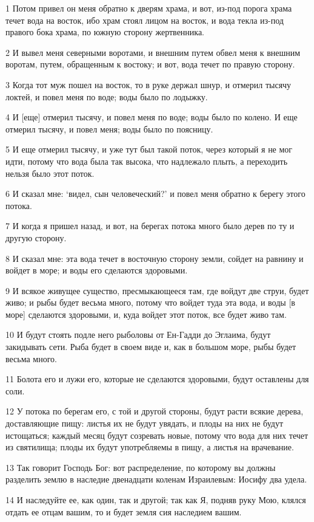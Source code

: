 \par 1 Потом привел он меня обратно к дверям храма, и вот, из-под порога храма течет вода на восток, ибо храм стоял лицом на восток, и вода текла из-под правого бока храма, по южную сторону жертвенника.
\par 2 И вывел меня северными воротами, и внешним путем обвел меня к внешним воротам, путем, обращенным к востоку; и вот, вода течет по правую сторону.
\par 3 Когда тот муж пошел на восток, то в руке держал шнур, и отмерил тысячу локтей, и повел меня по воде; воды было по лодыжку.
\par 4 И [еще] отмерил тысячу, и повел меня по воде; воды было по колено. И еще отмерил тысячу, и повел меня; воды было по поясницу.
\par 5 И еще отмерил тысячу, и уже тут был такой поток, через который я не мог идти, потому что вода была так высока, что надлежало плыть, а переходить нельзя было этот поток.
\par 6 И сказал мне: `видел, сын человеческий?' и повел меня обратно к берегу этого потока.
\par 7 И когда я пришел назад, и вот, на берегах потока много было дерев по ту и другую сторону.
\par 8 И сказал мне: эта вода течет в восточную сторону земли, сойдет на равнину и войдет в море; и воды его сделаются здоровыми.
\par 9 И всякое живущее существо, пресмыкающееся там, где войдут две струи, будет живо; и рыбы будет весьма много, потому что войдет туда эта вода, и воды [в море] сделаются здоровыми, и, куда войдет этот поток, все будет живо там.
\par 10 И будут стоять подле него рыболовы от Ен-Гадди до Эглаима, будут закидывать сети. Рыба будет в своем виде и, как в большом море, рыбы будет весьма много.
\par 11 Болота его и лужи его, которые не сделаются здоровыми, будут оставлены для соли.
\par 12 У потока по берегам его, с той и другой стороны, будут расти всякие дерева, доставляющие пищу: листья их не будут увядать, и плоды на них не будут истощаться; каждый месяц будут созревать новые, потому что вода для них течет из святилища; плоды их будут употребляемы в пищу, а листья на врачевание.
\par 13 Так говорит Господь Бог: вот распределение, по которому вы должны разделить землю в наследие двенадцати коленам Израилевым: Иосифу два удела.
\par 14 И наследуйте ее, как один, так и другой; так как Я, подняв руку Мою, клялся отдать ее отцам вашим, то и будет земля сия наследием вашим.
